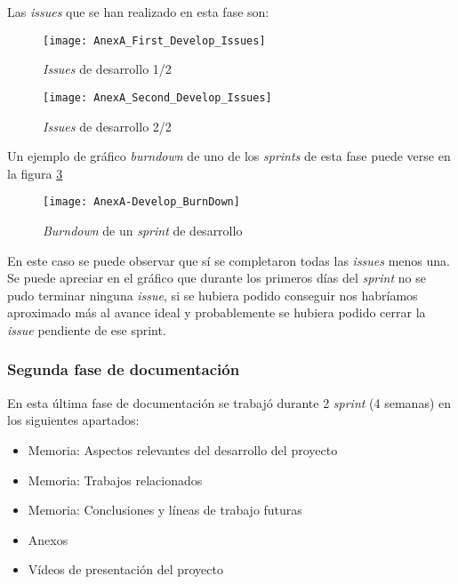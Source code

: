 Las \textit{issues} que se han realizado en esta fase son:

\begin{figure}[!h]
	\centering
	\texttt{[image: AnexA\_First\_Develop\_Issues]}
	\caption{\textit{Issues} de desarrollo 1/2}
	\label{fig:AnexA_First_Develop_Issues}
\end{figure}
\FloatBarrier

\begin{figure}[!h]
	\centering
	\texttt{[image: AnexA\_Second\_Develop\_Issues]}
	\caption{\textit{Issues} de desarrollo 2/2}
	\label{fig:AnexA_Second_Develop_Issues}
\end{figure}
\FloatBarrier

Un ejemplo de gráfico \textit{burndown} de uno de los \textit{sprints} de esta fase puede verse en la figura \ref{fig:AnexA-Develop_BurnDown}

\begin{figure}[!h]
	\centering
	\texttt{[image: AnexA-Develop\_BurnDown]}
	\caption{\textit{Burndown} de un \textit{sprint} de desarrollo}
	\label{fig:AnexA-Develop_BurnDown}
\end{figure}
\FloatBarrier

En este caso se puede observar que sí se completaron todas las \textit{issues} menos una. Se puede apreciar en el gráfico que durante los primeros días del \textit{sprint} no se pudo terminar ninguna \textit{issue}, si se hubiera podido conseguir nos habríamos aproximado más al avance ideal y probablemente se hubiera podido cerrar la \textit{issue} pendiente de ese sprint.

\subsubsection{Segunda fase de documentación}
En esta última fase de documentación se trabajó durante 2 \textit{sprint} (4 semanas) en los siguientes apartados:

\begin{itemize}
	\item Memoria: Aspectos relevantes del desarrollo del proyecto
	\item Memoria: Trabajos relacionados
	\item Memoria: Conclusiones y líneas de trabajo futuras
	\item Anexos
	\item Vídeos de presentación del proyecto
\end{itemize}

